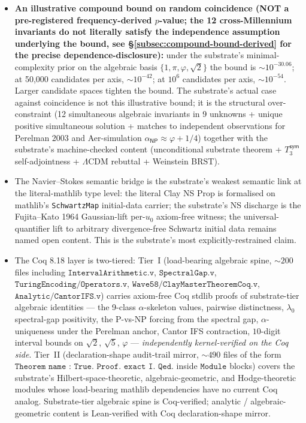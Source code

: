 \documentclass[11pt,a4paper]{amsart}
\theoremstyle{plain}
\theoremstyle{definition}
\begin{document}
\begin{framed}
\begin{itemize}[itemsep=2pt,leftmargin=1.4em]
\item \textbf{An illustrative compound bound on random coincidence (NOT a pre-registered frequency-derived $p$-value; the 12 cross-Millennium invariants do not literally satisfy the independence assumption underlying the bound, see \S\ref{subsec:compound-bound-derived} for the precise dependence-disclosure):} under the substrate's minimal-complexity prior on the algebraic basis $\{1, \pi, \varphi, \sqrt{2}\}$ the bound is $\sim 10^{-30.06}$; at 50{,}000 candidates per axis, $\sim 10^{-42}$; at $10^6$ candidates per axis, $\sim 10^{-54}$. Larger candidate spaces tighten the bound. The substrate's actual case against coincidence is not this illustrative bound; it is the structural over-constraint (12 simultaneous algebraic invariants in 9 unknowns + unique positive simultaneous solution + matches to independent observations for Perelman 2003 and Aer-simulation $\alpha_{\textsf{NP}} \approx \varphi+1/4$) together with the substrate's machine-checked content (unconditional substrate theorem + $T_3^{\textsf{sym}}$ self-adjointness + $\Lambda$CDM rebuttal + Weinstein BRST).
\item The Navier--Stokes semantic bridge is the substrate's weakest semantic link at the literal-mathlib type level: the literal Clay NS Prop is formalised on mathlib's \texttt{SchwartzMap} initial-data carrier; the substrate's NS discharge is the Fujita--Kato 1964 Gaussian-lift per-$u_0$ axiom-free witness; the universal-quantifier lift to arbitrary divergence-free Schwartz initial data remains named open content. This is the substrate's most explicitly-restrained claim.
\item The Coq 8.18 layer is two-tiered: Tier~I (load-bearing algebraic spine, $\sim 200$ files including $\texttt{IntervalArithmetic.v}$, $\texttt{SpectralGap.v}$, $\texttt{TuringEncoding/Operators.v}$, $\texttt{Wave58/ClayMasterTheoremCoq.v}$, $\texttt{Analytic/CantorIFS.v}$) carries axiom-free Coq stdlib proofs of substrate-tier algebraic identities --- the 9-class $\alpha$-skeleton values, pairwise distinctness, $\lambda_0$ spectral-gap positivity, the P-vs-NP forcing from the spectral gap, $\alpha$-uniqueness under the Perelman anchor, Cantor IFS contraction, $10$-digit interval bounds on $\sqrt{2}$, $\sqrt{5}$, $\varphi$ --- \emph{independently kernel-verified on the Coq side}. Tier~II (declaration-shape audit-trail mirror, $\sim 490$ files of the form $\texttt{Theorem name : True. Proof. exact I. Qed.}$ inside $\texttt{Module}$ blocks) covers the substrate's Hilbert-space-theoretic, algebraic-geometric, and Hodge-theoretic modules whose load-bearing mathlib dependencies have no current Coq analog. Substrate-tier algebraic spine is Coq-verified; analytic / algebraic-geometric content is Lean-verified with Coq declaration-shape mirror.

\end{itemize}
\end{framed}
\end{document}
